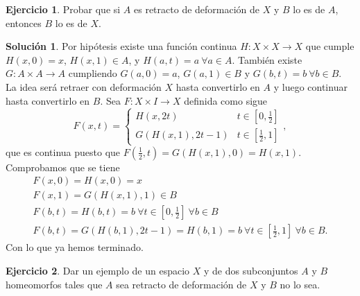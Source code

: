 \documentclass{article}
\theoremstyle{plain}
\theoremstyle{definition}
\newtheorem{exercise}{Ejercicio}
\newtheorem*{sol*}{Solución}
\begin{document}
\newpage
\begin{exercise}
Probar que si $A$ es retracto de deformación de $X$ y $B$ lo es de $A$, entonces $B$ lo es de $X$. 
\end{exercise}
\begin{sol*}
Por hipótesis existe una función continua $H:X\times X\to X$ que cumple $H(x,0)=x$, $H(x,1)\in A$, y $H(a,t)=a\ \forall a\in A$. También existe $G:A\times A\to A$ cumpliendo $G(a,0)=a$, $G(a,1)\in B$ y $G(b,t)=b\ \forall b\in B$. La idea será retraer con deformación $X$ hasta convertirlo en $A$ y luego continuar hasta convertirlo en $B$. Sea $F:X\times I\to X$ definida como sigue
\[
F(x,t)=\begin{cases}
H(x,2t) & t\in[0,\frac{1}{2}]\\
G(H(x,1),2t-1) & t\in[\frac{1}{2},1]
\end{cases},
\]
que es continua puesto que $F(\frac{1}{2},t)=G(H(x,1),0)=H(x,1)$. Comprobamos que se tiene
\begin{gather*}
F(x,0)=H(x,0)=x\\
F(x,1)=G(H(x,1),1)\in B\\
F(b,t)=H(b,t)=b\ \forall t\in [0,\frac{1}{2}]\ \forall b\in B\\
F(b,t)=G(H(b,1),2t-1)=H(b,1)=b\ \forall t\in[\frac{1}{2},1] \ \forall b\in B.
\end{gather*}
Con lo que ya hemos terminado. 
\end{sol*}
\newpage
\begin{exercise}Dar un ejemplo de un espacio $X$ y de dos subconjuntos $A$ y $B$ homeomorfos tales que $A$ sea retracto de deformación de $X$ y $B$ no lo sea.
\end{exercise}
\end{document}
